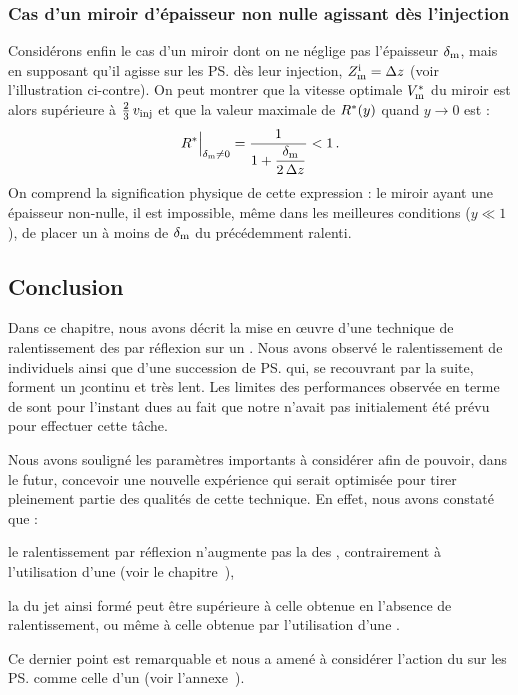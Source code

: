 \subsubsection{Cas d'un miroir d'épaisseur non nulle agissant dès l'injection}
Considérons enfin le cas d'un miroir dont on ne néglige pas l'épaisseur ${\delta_{\rm m}}$, mais en supposant qu'il agisse sur les \ps dès leur injection, \cad $Z_{\mathrm {m}}^{\mathrm i}={\Delta z}$ (voir l'illustration ci-contre). On peut montrer que la vitesse optimale ${V_{\rm {m}}^\ast}$ du miroir est alors supérieure à $\tfrac{2}{3}\,v_{{\rm {inj}}}$ et que la valeur maximale de $R^\ast(y)$ quand $y\rightarrow0$ est :
\[
\Avec{\Rmax^\ast}{\EpMir\neq0} = \frac{1}{1+\dfrac{\EpMir}{\DeltaZPaquet}} < 1
\pointformule
\]
On comprend la signification physique de cette expression : le miroir ayant une épaisseur non-nulle, il est impossible, même dans les meilleures conditions ($y\ll1$), de placer un \pat à moins de ${\delta_{\rm m}}$ du \p précédemment ralenti.

\casse

\subsection{Conclusion}
Dans ce chapitre, nous avons décrit la mise en \oe uvre d'une technique de ralentissement des \pats par réflexion sur un \mimamo. Nous avons observé le ralentissement de \pats individuels ainsi que d'une succession de \ps qui, se recouvrant par la suite, forment un \j continu et très lent. Les limites des performances observée en terme de \fat sont pour l'instant dues au fait que notre \setup n'avait pas initialement été prévu pour effectuer cette tâche.

Nous avons souligné les paramètres importants à considérer afin de pouvoir, dans le futur,  concevoir une nouvelle expérience qui serait optimisée pour tirer pleinement partie des qualités de cette technique. En effet, nous avons constaté que :
\begin{itemizel}
	\item le ralentissement par réflexion n'augmente pas la \dispvitlong des \pats, contrairement à l'utilisation d'une \secpent (voir le chapitre~),
	\item la \ddedpup du jet ainsi formé peut être supérieure à celle obtenue en l'absence de ralentissement, ou même à celle obtenue par l'utilisation d'une \secpent.
\end{itemizel}
Ce dernier point est remarquable et nous a amené à considérer l'action du \mimo sur les \ps comme celle d'un  (voir l'annexe~).





